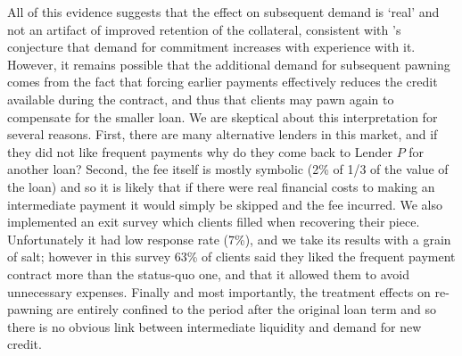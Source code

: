 \documentclass[oneside,11pt]{article}
\begin{document}

All of this evidence suggests that the effect on subsequent demand is `real' and not an artifact of improved retention of the collateral, consistent with \cite{Alcohol}'s conjecture that demand for commitment increases with experience with it. However, it remains possible that the additional demand for subsequent pawning comes from the fact that forcing earlier payments effectively reduces the credit available during the contract, and thus that clients may pawn again to compensate for the smaller loan. We are skeptical about this interpretation for several reasons. %
First,  there are many alternative lenders in this market, and if they did not like frequent payments why do they come back to Lender $P$ for another loan? Second, the fee itself is mostly symbolic (2\% of 1/3 of the value of the loan) and so it is likely that if there were real financial costs to making an intermediate payment it would simply be skipped and the fee incurred.  We also implemented an exit survey which clients filled when recovering their piece. Unfortunately it had low response rate (7\%), and we take its results with a grain of salt; however in this survey 63\% of clients said they liked the frequent payment contract more than the status-quo one, and that it allowed them to avoid unnecessary expenses. Finally and most importantly, the treatment effects on re-pawning are entirely confined to the period after the original loan term and so there is no obvious link between intermediate liquidity and demand for new credit.  
\end{document}
